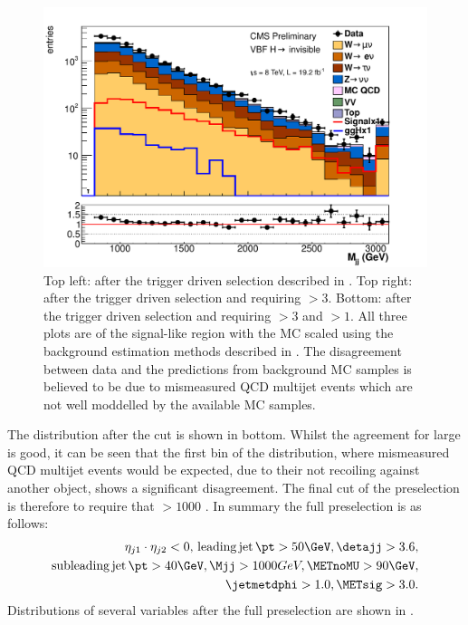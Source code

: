 \begin{figure}
  \includegraphics[width=.6\largefigwidth]{plots/parked/AN-14-243-figs/logmjj800nunu_dijet_M.pdf}
  \caption{Top left: \METsig after the trigger driven selection described in . Top right: \jetmetdphi after the trigger driven selection and requiring \METsig$>3$. Bottom: \Mjj after the trigger driven selection and requiring \METsig$>3$ and \jetmetdphi$>1$. All three plots are of the signal-like region with the \ac{MC} scaled using the background estimation methods described in . The disagreement between data and the predictions from background \ac{MC} samples is believed to be due to mismeasured \ac{QCD} multijet events which are not well moddelled by the available \ac{MC} samples.}
  \label{fig:parkedpresel}
\end{figure}

The \Mjj distribution after the \jetmetdphi cut is shown in  bottom. Whilst the agreement for large \Mjj is good, it can be seen that the first bin of the distribution, where mismeasured \ac{QCD} multijet events would be expected, due to their not recoiling against another object, shows a significant disagreement. The final cut of the preselection is therefore to require that \Mjj$>1000$ \GeV. In summary the full preselection is as follows:
\begin{equation}
  \label{eq:presel}
  \begin{split}
  \eta_{j1}\cdot\eta_{j2}<0,\,\mathrm{leading\,jet\,}\pt>50 \GeV, \detajj>3.6, \\
  \mathrm{subleading\,jet\,}\pt>40 \GeV, \Mjj>1000 GeV, \METnoMU>90\GeV, \\
  \jetmetdphi>1.0, \METsig>3.0.
  \end{split}
\end{equation}
Distributions of several variables after the full preselection are shown in .


